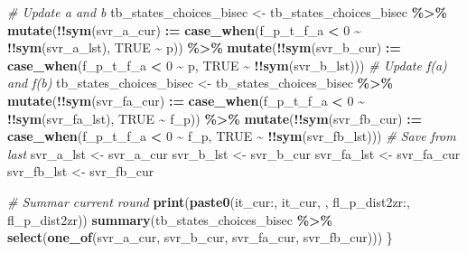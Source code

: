 \documentclass[
]{book}
\newenvironment{Shaded}{\begin{snugshade}}{\end{snugshade}}
\newcommand{\CommentTok}[1]{\textcolor[rgb]{0.56,0.35,0.01}{\textit{#1}}}
\newcommand{\DecValTok}[1]{\textcolor[rgb]{0.00,0.00,0.81}{#1}}
\newcommand{\ErrorTok}[1]{\textcolor[rgb]{0.64,0.00,0.00}{\textbf{#1}}}
\newcommand{\KeywordTok}[1]{\textcolor[rgb]{0.13,0.29,0.53}{\textbf{#1}}}
\newcommand{\NormalTok}[1]{#1}
\newcommand{\OperatorTok}[1]{\textcolor[rgb]{0.81,0.36,0.00}{\textbf{#1}}}
\newcommand{\OtherTok}[1]{\textcolor[rgb]{0.56,0.35,0.01}{#1}}
\newcommand{\StringTok}[1]{\textcolor[rgb]{0.31,0.60,0.02}{#1}}
\begin{document}
\begin{Shaded}
\begin{Highlighting}[]
  \CommentTok{\# Update a and b}
\NormalTok{  tb\_states\_choices\_bisec \textless{}{-}}\StringTok{ }\NormalTok{tb\_states\_choices\_bisec }\OperatorTok{\%\textgreater{}\%}
\StringTok{    }\KeywordTok{mutate}\NormalTok{(}\OperatorTok{!!}\KeywordTok{sym}\NormalTok{(svr\_a\_cur) }\OperatorTok{:}\ErrorTok{=}
\StringTok{             }\KeywordTok{case\_when}\NormalTok{(f\_p\_t\_f\_a }\OperatorTok{\textless{}}\StringTok{ }\DecValTok{0} \OperatorTok{\textasciitilde{}}\StringTok{ }\OperatorTok{!!}\KeywordTok{sym}\NormalTok{(svr\_a\_lst),}
                       \OtherTok{TRUE} \OperatorTok{\textasciitilde{}}\StringTok{ }\NormalTok{p)) }\OperatorTok{\%\textgreater{}\%}
\StringTok{    }\KeywordTok{mutate}\NormalTok{(}\OperatorTok{!!}\KeywordTok{sym}\NormalTok{(svr\_b\_cur) }\OperatorTok{:}\ErrorTok{=}
\StringTok{             }\KeywordTok{case\_when}\NormalTok{(f\_p\_t\_f\_a }\OperatorTok{\textless{}}\StringTok{ }\DecValTok{0} \OperatorTok{\textasciitilde{}}\StringTok{ }\NormalTok{p,}
                       \OtherTok{TRUE} \OperatorTok{\textasciitilde{}}\StringTok{ }\OperatorTok{!!}\KeywordTok{sym}\NormalTok{(svr\_b\_lst)))}
  \CommentTok{\# Update f(a) and f(b)}
\NormalTok{  tb\_states\_choices\_bisec \textless{}{-}}\StringTok{ }\NormalTok{tb\_states\_choices\_bisec }\OperatorTok{\%\textgreater{}\%}
\StringTok{    }\KeywordTok{mutate}\NormalTok{(}\OperatorTok{!!}\KeywordTok{sym}\NormalTok{(svr\_fa\_cur) }\OperatorTok{:}\ErrorTok{=}
\StringTok{             }\KeywordTok{case\_when}\NormalTok{(f\_p\_t\_f\_a }\OperatorTok{\textless{}}\StringTok{ }\DecValTok{0} \OperatorTok{\textasciitilde{}}\StringTok{ }\OperatorTok{!!}\KeywordTok{sym}\NormalTok{(svr\_fa\_lst),}
                       \OtherTok{TRUE} \OperatorTok{\textasciitilde{}}\StringTok{ }\NormalTok{f\_p)) }\OperatorTok{\%\textgreater{}\%}
\StringTok{    }\KeywordTok{mutate}\NormalTok{(}\OperatorTok{!!}\KeywordTok{sym}\NormalTok{(svr\_fb\_cur) }\OperatorTok{:}\ErrorTok{=}
\StringTok{             }\KeywordTok{case\_when}\NormalTok{(f\_p\_t\_f\_a }\OperatorTok{\textless{}}\StringTok{ }\DecValTok{0} \OperatorTok{\textasciitilde{}}\StringTok{ }\NormalTok{f\_p,}
                       \OtherTok{TRUE} \OperatorTok{\textasciitilde{}}\StringTok{ }\OperatorTok{!!}\KeywordTok{sym}\NormalTok{(svr\_fb\_lst)))}
  \CommentTok{\# Save from last}
\NormalTok{  svr\_a\_lst \textless{}{-}}\StringTok{ }\NormalTok{svr\_a\_cur}
\NormalTok{  svr\_b\_lst \textless{}{-}}\StringTok{ }\NormalTok{svr\_b\_cur}
\NormalTok{  svr\_fa\_lst \textless{}{-}}\StringTok{ }\NormalTok{svr\_fa\_cur}
\NormalTok{  svr\_fb\_lst \textless{}{-}}\StringTok{ }\NormalTok{svr\_fb\_cur}

  \CommentTok{\# Summar current round}
  \KeywordTok{print}\NormalTok{(}\KeywordTok{paste0}\NormalTok{(}\StringTok{\textquotesingle{}it\_cur:\textquotesingle{}}\NormalTok{, it\_cur, }\StringTok{\textquotesingle{}, fl\_p\_dist2zr:\textquotesingle{}}\NormalTok{, fl\_p\_dist2zr))}
  \KeywordTok{summary}\NormalTok{(tb\_states\_choices\_bisec }\OperatorTok{\%\textgreater{}\%}
\StringTok{            }\KeywordTok{select}\NormalTok{(}\KeywordTok{one\_of}\NormalTok{(svr\_a\_cur, svr\_b\_cur, svr\_fa\_cur, svr\_fb\_cur)))}
\NormalTok{\}}
\end{Highlighting}
\end{Shaded}
\end{document}
